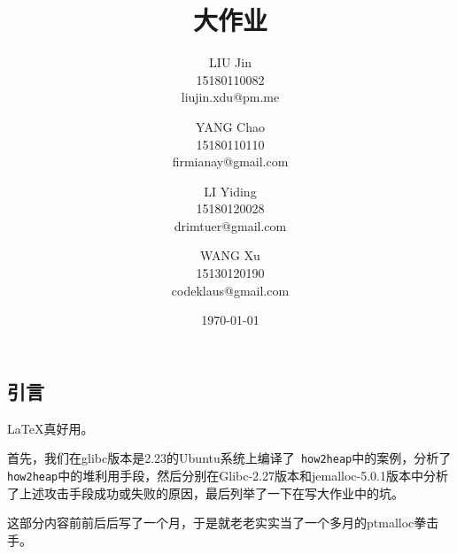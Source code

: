 \documentclass{article}
\title{\Huge{\classname{} 大作业}}
\author{LIU Jin\\
15180110082 \\
\small{liujin.xdu@pm.me} \and
YANG Chao\\
15180110110 \\
\small{firmianay@gmail.com} \and
LI Yiding\\
15180120028 \\
\small{drimtuer@gmail.com} \and
WANG Xu\\
15130120190 \\
\small{codeklaus@gmail.com}
}
\date{\today}
\begin{document}
\maketitle

\renewcommand{\contentsname}{目录}

\newpage
\tableofcontents
\newpage

\begin{center}
    \section{引言}
\end{center}

\setlength{\parindent}{2em}

 \LaTeX 真好用。
 
 首先，我们在glibc版本是2.23的Ubuntu系统上编译了\verb+ how2heap+中的案例，分析了\verb+ how2heap+中的堆利用手段，然后分别在Glibc-2.27版本和jemalloc-5.0.1版本中分析了上述攻击手段成功或失败的原因，最后列举了一下在写大作业中的坑。
 
 这部分内容前前后后写了一个月，于是就老老实实当了一个多月的ptmalloc拳击手。

\newpage









\end{document}
